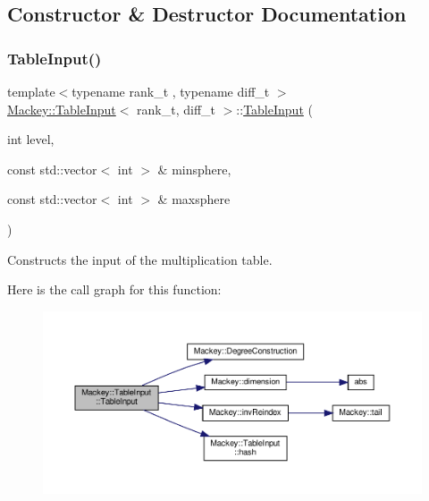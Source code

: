 \subsection{Constructor \& Destructor Documentation}
\mbox{\label{classMackey_1_1TableInput_ac2cad07d3e3188d9254d39affad86713}} 
\subsubsection{\texorpdfstring{Table\+Input()}{TableInput()}}
{\footnotesize\ttfamily template$<$typename rank\+\_\+t , typename diff\+\_\+t $>$ \\
\hyperlink{classMackey_1_1TableInput}{Mackey\+::\+Table\+Input}$<$ rank\+\_\+t, diff\+\_\+t $>$\+::\hyperlink{classMackey_1_1TableInput}{Table\+Input} (\begin{DoxyParamCaption}\item[{int}]{level,  }\item[{const std\+::vector$<$ int $>$ \&}]{minsphere,  }\item[{const std\+::vector$<$ int $>$ \&}]{maxsphere }\end{DoxyParamCaption})\hspace{0.3cm}{\ttfamily [protected]}}



Constructs the input of the multiplication table. 

Here is the call graph for this function\+:\nopagebreak
\begin{figure}[H]
\begin{center}
\leavevmode
\includegraphics[width=350pt]{classMackey_1_1TableInput_ac2cad07d3e3188d9254d39affad86713_cgraph}
\end{center}
\end{figure}


